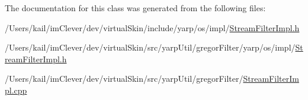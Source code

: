 The documentation for this class was generated from the following files:\begin{DoxyCompactItemize}
\item 
/Users/kail/imClever/dev/virtualSkin/include/yarp/os/impl/\hyperlink{include_2yarp_2os_2impl_2_stream_filter_impl_8h}{StreamFilterImpl.h}\item 
/Users/kail/imClever/dev/virtualSkin/src/yarpUtil/gregorFilter/yarp/os/impl/\hyperlink{src_2yarp_util_2gregor_filter_2yarp_2os_2impl_2_stream_filter_impl_8h}{StreamFilterImpl.h}\item 
/Users/kail/imClever/dev/virtualSkin/src/yarpUtil/gregorFilter/\hyperlink{_stream_filter_impl_8cpp}{StreamFilterImpl.cpp}\end{DoxyCompactItemize}
